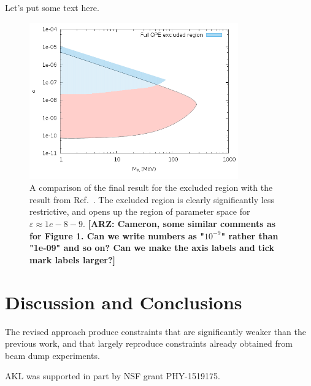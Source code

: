 \documentclass[nofootinbib,prd,superscriptaddress,twocolumn]{revtex4}
\newcommand{\arz}[1]{{{\bf{\color{BrickRed}[ARZ: #1]}}}}
\begin{document}
Let's put some text here.

\begin{figure}[th]
	\includegraphics[width=9cm]{endtoend.png}
	\caption{A comparison of the final result for the excluded region with the result from Ref.~\cite{dent_etal12}. The excluded region is clearly significantly less restrictive, and opens up the region of parameter space for $\varepsilon \approx  1e-8-9 $.
\arz{Cameron, some similar comments as for Figure 1. Can we write numbers as "$10^{-9}$" rather 
than "1e-09" and so on? Can we make the axis labels and tick mark labels larger?}	
	}
\end{figure}


\section{Discussion and Conclusions}
\label{section:conclusions}


	The revised approach produce constraints that are significantly weaker than the previous work, and that largely reproduce constraints already obtained from beam dump experiments. 




\acknowledgments

AKL was supported in part by NSF grant PHY-1519175.



\end{document}
